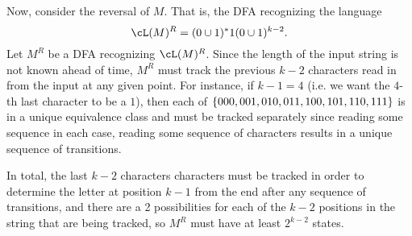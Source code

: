 \begin{problem}
\begin{enumalph}
\begin{Answer}
        \newpage
        Now, consider the reversal of $M$.
        That is, the DFA recognizing the language \[ \cL(M)^R = (0 \cup 1)^*1(0 \cup 1)^{k-2}. \]
        Let $M^R$ be a DFA recognizing $\cL(M)^R$.
        Since the length of the input string is not known ahead of time,
        $M^R$ must track the previous $k-2$ characters read in from the input
        at any given point. For instance, if $k-1 = 4$ (i.e. we want the $4$-th last character
        to be a $1$), then each of $\left\{000, 001, 010, 011, 100, 101, 110, 111\right\}$ is in a
        unique equivalence class and must be tracked separately since reading some sequence
        in each case, reading some sequence of characters results in a unique sequence
        of transitions.

        In total, the last $k-2$ characters characters must be tracked in order to determine
        the letter at position $k-1$ from the end after any sequence of transitions,
        and there are a 2 possibilities for each of the $k-2$ positions in the string that
        are being tracked, so $M^R$ must have at least $2^{k-2}$ states.

      
      \end{Answer}
  \end{enumalph}
\end{problem}
